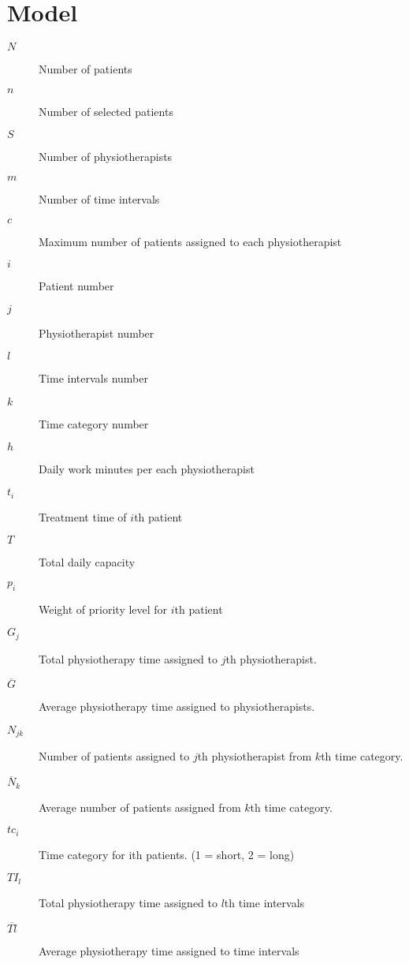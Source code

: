 \documentclass[a4paper,12pt]{article}
\begin{document}
\section{Model}
\begin{description}
	\item[$N$] Number of patients
	\item[$n$] Number of selected patients
	\item[$S$] Number of physiotherapists
	\item[$m$] Number of time intervals
	\item[$c$] Maximum number of patients assigned to each physiotherapist
	\item[$i$] Patient number
	\item[$j$] Physiotherapist number
	\item[$l$] Time intervals number
	\item[$k$] Time category number
	\item[$h$] Daily work minutes per each physiotherapist
	\item[$t_i$] Treatment time of $i$th patient
	\item[$T$] Total daily capacity
	\item[$p_i$] Weight of priority level for $i$th patient
	\item[$G_j$] Total physiotherapy time assigned to $j$th physiotherapist.
	\item[$\overline{G}$] Average physiotherapy time assigned to physiotherapists.
	\item[$N_{jk}$] Number of patients assigned to $j$th physiotherapist from $k$th time category.
	\item[$\overline{N}_k$] Average number of patients assigned from $k$th time category.
	\item[$tc_i$] Time category for ith patients. (1 = short, 2 = long)
	\item[$TI_l$] Total physiotherapy time assigned to $l$th time intervals
	\item[$\overline{Tl}$] Average physiotherapy time assigned to time intervals
\end{description}

\begin{lpformulation}
\end{lpformulation}
\end{document}
